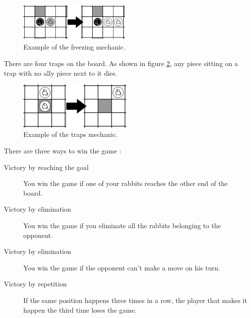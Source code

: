 \begin{figure}[!h]
\centering
\includegraphics[width=0.5\textwidth]{1_Presentation/1.1_Arimaa_rules_Gabriel/Pictures/Freeze.png}
\caption{\label{fig:freeze}Example of the freezing mechanic.}
\end{figure}

There are four traps on the board. As shown in figure \ref{fig:trap}, any piece sitting on a trap with no ally piece next to it dies.

\begin{figure}[!h]
\centering
\includegraphics[width=0.5\textwidth]{1_Presentation/1.1_Arimaa_rules_Gabriel/Pictures/Trap.png}
\caption{\label{fig:trap}Example of the traps mechanic.}
\end{figure}

There are three ways to win the game :

\begin{description}
\item[Victory by reaching the goal] You win the game if one of your rabbits reaches the other end of the board.
\item[Victory by elimination] You win the game if you eliminate all the rabbits belonging to the opponent.
\item[Victory by elimination] You win the game if the opponent can't make a move on his turn.
\item[Victory by repetition] If the same position happens three times in a row, the player that makes it happen the third time loses the game.
\end{description}